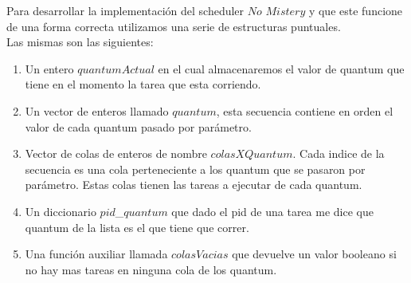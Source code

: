 Para desarrollar la implementación del scheduler $No$ $Mistery$ y que este funcione de una forma correcta
utilizamos una serie de estructuras puntuales. \\
Las mismas son las siguientes:\\
\begin{enumerate}
\item Un entero $quantumActual$ en el cual almacenaremos el valor de quantum que tiene en el momento la tarea que esta corriendo.
\item Un vector de enteros llamado $quantum$, esta secuencia contiene en orden el valor de cada quantum pasado por par\'{a}metro.
\item Vector de colas de enteros de nombre $colasXQuantum$. Cada indice de la secuencia es una cola perteneciente a los quantum 
que se pasaron por par\'{a}metro. Estas colas tienen las tareas a ejecutar de cada quantum.
\item Un diccionario $pid$\_$quantum$ que dado el pid de una tarea me dice que quantum de la lista es el que tiene que correr.
\item Una funci\'{o}n auxiliar llamada $colasVacias$ que devuelve un valor booleano si no hay mas tareas en ninguna cola de los 
quantum.
\end{enumerate}

